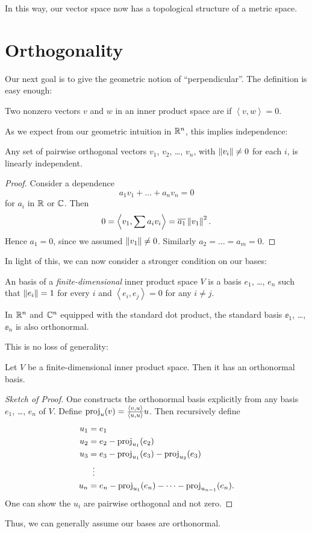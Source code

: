In this way, our vector space now has a topological structure of a metric space.

\section{Orthogonality}
Our next goal is to give the geometric notion of ``perpendicular''.
The definition is easy enough:
\begin{definition}
	Two nonzero vectors $v$ and $w$ in an inner product space
	are  if $\left< v,w \right> = 0$.
\end{definition}

As we expect from our geometric intuition in $\mathbb R^n$,
this implies independence:
\begin{lemma}
	Any set of pairwise orthogonal vectors $v_1$, $v_2$, \dots, $v_n$,
	with $\left\lVert v_i \right\rVert \neq 0$ for each $i$,
	is linearly independent.
\end{lemma}
\begin{proof}
	Consider a dependence
	\[ a_1 v_1 + \dots + a_n v_n = 0 \]
	for $a_i$ in $\mathbb R$ or $\mathbb C$.
	Then \[ 0 = \left< v_1, \sum a_i v_i \right> = \overline{a_1} \left\lVert v_1 \right\rVert^2. \]
	Hence $a_1 = 0$, since we assumed $\left\lVert v_1 \right\rVert \neq 0$.
	Similarly $a_2 = \dots = a_m = 0$.
\end{proof}

In light of this, we can now consider a stronger condition on our bases:
\begin{definition}
	An  basis of a
	\emph{finite-dimensional} inner product space $V$
	is a basis $e_1$, \dots, $e_n$ such that
	$\left\lVert e_i \right\rVert = 1$ for every $i$ and
	$\left< e_i, e_j \right> = 0$ for any $i \neq j$.
\end{definition}
\begin{example}
	In $\mathbb R^n$ and $\mathbb C^n$ equipped with the standard dot product,
	the standard basis $\ee_1$, \dots, $\ee_n$ is also orthonormal.
\end{example}
This is no loss of generality:
\begin{theorem}
	Let $V$ be a finite-dimensional inner product space.
	Then it has an orthonormal basis.
\end{theorem}
\begin{proof}[Sketch of Proof]
	One constructs the orthonormal basis explicitly from any basis
	$e_1$, \dots, $e_n$ of $V$.
	Define $\operatorname{proj}_u(v) = \frac{\left< v,u\right>}{\left< u,u\right>} u$.
	Then recursively define
	\begin{align*}
		u_1 &= e_1 \\
		u_2 &= e_2 - \opname{proj}_{u_1}(e_2) \\
		u_3 &= e_3 - \opname{proj}_{u_1}(e_3) - \opname{proj}_{u_2}(e_3) \\
		&\vdotswithin{=} \\
		u_n &= e_n - \opname{proj}_{u_1}(e_n) - \dots - \opname{proj}_{u_{n-1}}(e_n).
	\end{align*}
	One can show the $u_i$ are pairwise orthogonal and not zero.
\end{proof}
Thus, we can generally assume our bases are orthonormal.

